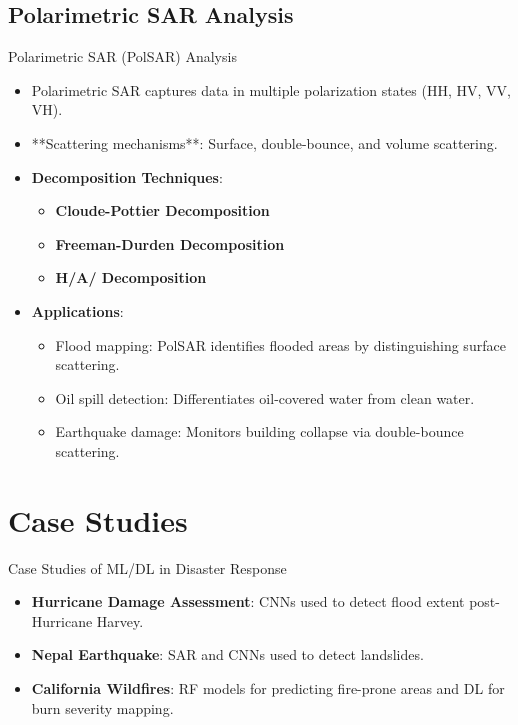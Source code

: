 \documentclass[10pt]{beamer}
\begin{document}
\subsection{Polarimetric SAR Analysis}
\begin{frame}{Polarimetric SAR (PolSAR) Analysis}
    \begin{itemize}
        \item Polarimetric SAR captures data in multiple polarization states (HH, HV, VV, VH).
        \item **Scattering mechanisms**: Surface, double-bounce, and volume scattering.
        \item \textbf{Decomposition Techniques}:
        \begin{itemize}
            \item \textbf{Cloude-Pottier Decomposition}
            \item \textbf{Freeman-Durden Decomposition}
            \item \textbf{H/A/ Decomposition}
        \end{itemize}
        \item \textbf{Applications}:
        \begin{itemize}
            \item Flood mapping: PolSAR identifies flooded areas by distinguishing surface scattering.
            \item Oil spill detection: Differentiates oil-covered water from clean water.
            \item Earthquake damage: Monitors building collapse via double-bounce scattering.
        \end{itemize}
    \end{itemize}
\end{frame}

\section{Case Studies}
\begin{frame}{Case Studies of ML/DL in Disaster Response}
    \begin{itemize}
        \item \textbf{Hurricane Damage Assessment}: CNNs used to detect flood extent post-Hurricane Harvey.
        \item \textbf{Nepal Earthquake}: SAR and CNNs used to detect landslides.
        \item \textbf{California Wildfires}: RF models for predicting fire-prone areas and DL for burn severity mapping.
    \end{itemize}
\end{frame}
\end{document}
